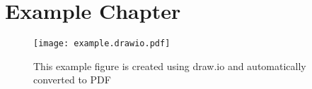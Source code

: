 \documentclass{report}
\begin{document}
\chapter{Example Chapter}
    \lipsum[1]
    \begin{figure}[ht]
        \centering
        \texttt{[image: example.drawio.pdf]}
        \caption{This example figure is created using draw.io and automatically converted to PDF}
    \end{figure}
    \lipsum[2]
\end{document}
